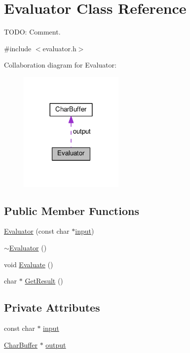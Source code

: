 \hypertarget{classEvaluator}{}\section{Evaluator Class Reference}
\label{classEvaluator}


T\+O\+DO\+: Comment.  




{\ttfamily \#include $<$evaluator.\+h$>$}



Collaboration diagram for Evaluator\+:
\nopagebreak
\begin{figure}[H]
\begin{center}
\leavevmode
\includegraphics[width=144pt]{db/d03/classEvaluator__coll__graph}
\end{center}
\end{figure}
\subsection*{Public Member Functions}
\begin{DoxyCompactItemize}
\item 
\hyperlink{classEvaluator_a5eb7fa4c5ccc81b3f9e88980b9d62dd5}{Evaluator} (const char $\ast$\hyperlink{classEvaluator_a13bf216912227688690b87072bffcd59}{input})
\item 
\hyperlink{classEvaluator_ac10971f54d227b1ef9aa5b28872b0272}{$\sim$\+Evaluator} ()
\item 
void \hyperlink{classEvaluator_a40b30ece9d43c658877ee7f52aaec0a8}{Evaluate} ()
\item 
char $\ast$ \hyperlink{classEvaluator_abcc678772175bf00127a3b307463ae4b}{Get\+Result} ()
\end{DoxyCompactItemize}
\subsection*{Private Attributes}
\begin{DoxyCompactItemize}
\item 
const char $\ast$ \hyperlink{classEvaluator_a13bf216912227688690b87072bffcd59}{input}
\item 
\hyperlink{classCharBuffer}{Char\+Buffer} $\ast$ \hyperlink{classEvaluator_a35018fd9dd13289a6dbf967cd1acd13c}{output}
\end{DoxyCompactItemize}


